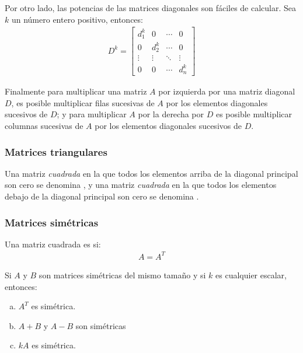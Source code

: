 \documentclass[a4paper,12pt]{article}
\begin{document}
Por otro lado, las potencias de las matrices diagonales son fáciles de
calcular. Sea $k$ un número entero positivo, entonces:
\begin{align*}
  D^k=
\begin{bmatrix}
  d_1^k &   0   & \cdots  & 0 \\
  0     &  d_2^k& \cdots  & 0 \\
  \vdots&\vdots & \ddots  &\vdots  \\
  0     &   0   & \cdots  & d_n^k 
\end{bmatrix}
\end{align*}

Finalmente para multiplicar una matriz $A$ por izquierda por una matriz
diagonal $D$, es posible multiplicar filas sucesivas de $A$ por los elementos
diagonales sucesivos de $D$; y para multiplicar $A$ por la derecha por
$D$ es posible multiplicar columnas sucesivas de $A$ por los elementos
diagonales sucesivos de $D$.

\subsubsection{Matrices triangulares}

\begin{concept}
  Una matriz \emph{cuadrada} en la que todos los elementos arriba de la
  diagonal principal son cero se denomina , y una
  matriz \emph{cuadrada} en la que todos los elementos debajo de la
  diagonal principal son cero se denomina .
\end{concept}

\subsubsection{Matrices simétricas}

\begin{concept}[i]
  Una matriz cuadrada es  si:
  \begin{align*}
    A=A^T
  \end{align*}
\end{concept}

\begin{theorem}
  Si $A$ y $B$ son matrices simétricas del mismo tamaño y si $k$ es cualquier
  escalar, entonces:
  \begin{enumerate}[(a)]
    \item $A^T$ es simétrica.
    \item $A+B$ y $A-B$ son simétricas
    \item $kA$ es simétrica.
  \end{enumerate}
  \label{theo:simetmat}
\end{theorem}
\end{document}
